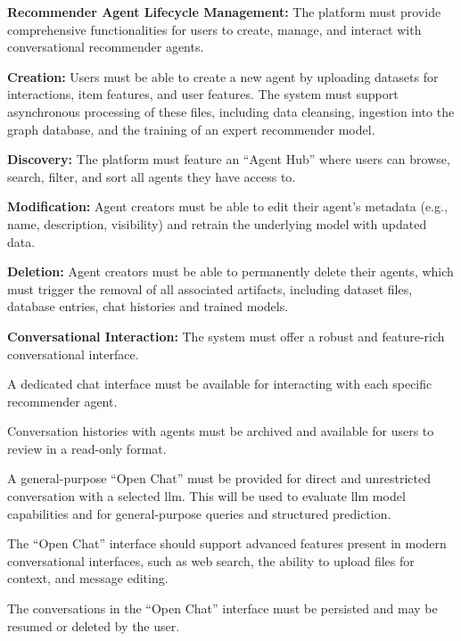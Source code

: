 \begin{functionalmod}[AGENT]
    \item \textbf{Recommender Agent Lifecycle Management:} The platform must provide comprehensive functionalities for users to create, manage, and interact with conversational recommender agents.
    \begin{functionalmod}
        \item \textbf{Creation:} Users must be able to create a new agent by uploading datasets for interactions, item features, and user features. The system must support asynchronous processing of these files, including data cleansing, ingestion into the graph database, and the training of an expert recommender model.
        \item \textbf{Discovery:} The platform must feature an ``Agent Hub'' where users can browse, search, filter, and sort all agents they have access to.
        \item \textbf{Modification:} Agent creators must be able to edit their agent's metadata (e.g., name, description, visibility) and retrain the underlying model with updated data.
        \item \textbf{Deletion:} Agent creators must be able to permanently delete their agents, which must trigger the removal of all associated artifacts, including dataset files, database entries, chat histories and trained models.
    \end{functionalmod}
\end{functionalmod}

\begin{functionalmod}[CHAT]
    \item \textbf{Conversational Interaction:} The system must offer a robust and feature-rich conversational interface.
    \begin{functionalmod}
        \item A dedicated chat interface must be available for interacting with each specific recommender agent.
        \item Conversation histories with agents must be archived and available for users to review in a read-only format.
        \item A general-purpose ``Open Chat'' must be provided for direct and unrestricted conversation with a selected \ac{llm}. This will be used to evaluate \acs{llm} model capabilities and for general-purpose queries and structured prediction.
        \item The ``Open Chat'' interface should support advanced features present in modern conversational interfaces, such as web search, the ability to upload files for context, and message editing.
        \item The conversations in the ``Open Chat'' interface must be persisted and may be resumed or deleted by the user.
    \end{functionalmod}
\end{functionalmod}

